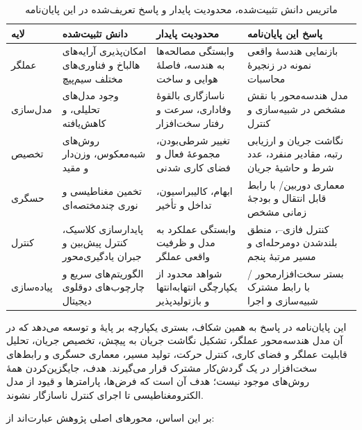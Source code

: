 \begin{table}[htbp]
	\centering
	\caption{ماتریس دانش تثبیت‌شده، محدودیت پایدار و پاسخ تعریف‌شده در این پایان‌نامه}
	\label{tab:literature-gap-matrix}
	\renewcommand{\arraystretch}{1.24}
	\setlength{\tabcolsep}{3pt}
	\scriptsize
	\begin{tabular}{|p{}|p{}|p{}|p{}|}
		\hline
		\textbf{لایه} & \textbf{دانش تثبیت‌شده} & \textbf{محدودیت پایدار} & \textbf{پاسخ این پایان‌نامه} \\
		\hline
		عملگر & امکان‌پذیری آرایه‌های هالباخ و فناوری‌های مختلف سیم‌پیچ & وابستگی مصالحه‌ها به هندسه، فاصلهٔ هوایی و ساخت & بازنمایی هندسهٔ واقعی نمونه در زنجیرهٔ محاسبات \\
		\hline
		مدل‌سازی & وجود مدل‌های تحلیلی، \lr{FEM} و کاهش‌یافته & ناسازگاری بالقوهٔ وفاداری، سرعت و رفتار سخت‌افزار & مدل هندسه‌محور با نقش مشخص در شبیه‌سازی و کنترل \\
		\hline
		تخصیص & روش‌های شبه‌معکوس، وزن‌دار و مقید & تغییر شرطی‌بودن، مجموعهٔ فعال و فضای کاری شدنی & نگاشت جریان و ارزیابی رتبه، مقادیر منفرد، عدد شرط و حاشیهٔ جریان \\
		\hline
		حسگری & تخمین مغناطیسی و نوری چندمختصه‌ای & ابهام، کالیبراسیون، تداخل و تأخیر & معماری دوربین/\lr{AprilTag} با رابط قابل انتقال و بودجهٔ زمانی مشخص \\
		\hline
		کنترل & پایدارسازی کلاسیک، کنترل پیش‌بین و جبران یادگیری‌محور & وابستگی عملکرد به مدل و ظرفیت واقعی عملگر & کنترل فازی--\lr{PID}، منطق بلندشدن دومرحله‌ای و مسیر مرتبهٔ پنجم \\
		\hline
		پیاده‌سازی & الگوریتم‌های سریع و چارچوب‌های دوقلوی دیجیتال & شواهد محدود از یکپارچگی انتهابه‌انتها و بازتولیدپذیر & بستر سخت‌افزارمحور \lr{ROS~2}/\lr{Gazebo} با رابط مشترک شبیه‌سازی و اجرا \\
		\hline
	\end{tabular}
\end{table}

این پایان‌نامه در پاسخ به همین شکاف، بستری یکپارچه بر پایهٔ  و  توسعه می‌دهد که در آن مدل هندسه‌محور عملگر، تشکیل نگاشت جریان به پیچش، تخصیص جریان، تحلیل قابلیت عملگر و فضای کاری، کنترل حرکت، تولید مسیر، معماری حسگری و رابط‌های سخت‌افزار در یک گردش‌کار مشترک قرار می‌گیرند. هدف، جایگزین‌کردن همهٔ روش‌های موجود نیست؛ هدف آن است که فرض‌ها، پارامترها و قیود از مدل الکترومغناطیسی تا اجرای کنترل ناسازگار نشوند.

بر این اساس، محورهای اصلی پژوهش عبارت‌اند از:

